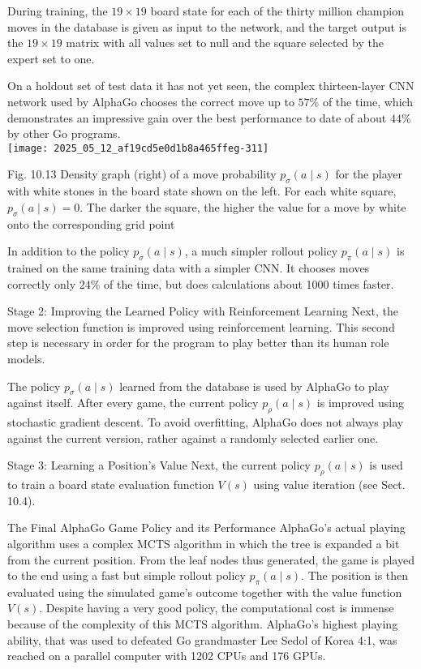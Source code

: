 \documentclass[10pt]{article}
\begin{document}
During training, the $19 \times 19$ board state for each of the thirty million champion moves in the database is given as input to the network, and the target output is the $19 \times 19$ matrix with all values set to null and the square selected by the expert set to one.

On a holdout set of test data it has not yet seen, the complex thirteen-layer CNN network used by AlphaGo chooses the correct move up to $57 \%$ of the time, which demonstrates an impressive gain over the best performance to date of about $44 \%$ by other Go programs.\\
\texttt{[image: 2025\_05\_12\_af19cd5e0d1b8a465ffeg-311]}

Fig. 10.13 Density graph (right) of a move probability $p_{\sigma}(a \mid s)$ for the player with white stones in the board state shown on the left. For each white square, $p_{\sigma}(a \mid s)=0$. The darker the square, the higher the value for a move by white onto the corresponding grid point

In addition to the policy $p_{\sigma}(a \mid s)$, a much simpler rollout policy $p_{\pi}(a \mid s)$ is trained on the same training data with a simpler CNN. It chooses moves correctly only $24 \%$ of the time, but does calculations about 1000 times faster.

Stage 2: Improving the Learned Policy with Reinforcement Learning Next, the move selection function is improved using reinforcement learning. This second step is necessary in order for the program to play better than its human role models.

The policy $p_{\sigma}(a \mid s)$ learned from the database is used by AlphaGo to play against itself. After every game, the current policy $p_{\rho}(a \mid s)$ is improved using stochastic gradient descent. To avoid overfitting, AlphaGo does not always play against the current version, rather against a randomly selected earlier one.

Stage 3: Learning a Position's Value Next, the current policy $p_{\rho}(a \mid s)$ is used to train a board state evaluation function $V(s)$ using value iteration (see Sect. 10.4).

The Final AlphaGo Game Policy and its Performance AlphaGo's actual playing algorithm uses a complex MCTS algorithm in which the tree is expanded a bit from the current position. From the leaf nodes thus generated, the game is played to the end using a fast but simple rollout policy $p_{\pi}(a \mid s)$. The position is then evaluated using the simulated game's outcome together with the value function $V(s)$. Despite having a very good policy, the computational cost is immense because of the complexity of this MCTS algorithm. AlphaGo's highest playing ability, that was used to defeated Go grandmaster Lee Sedol of Korea 4:1, was reached on a parallel computer with 1202 CPUs and 176 GPUs.
\end{document}
